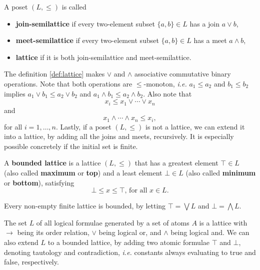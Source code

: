 \documentclass{llncs}
\begin{document}
\begin{definition}
\label{def:lattice}
A poset $(L, \leq)$ is called
\begin{itemize}
    \item \textbf{join-semilattice} if every two-element subset $\{a, b\} \in L$ has a join $a \vee b$,
    \item \textbf{meet-semilattice} if every two-element subset $\{a, b\} \in L$ has a meet $a \wedge b$,
    \item \textbf{lattice} if it is both join-semilattice and meet-semilattice.
\end{itemize}
\end{definition}

The definition \ref{def:lattice} makes $\vee$ and $\wedge$ associative commutative binary operations. Note that both operations are $\leq$-monoton, \textit{i.e.} $a_1 \leq a_2$ and $b_1 \leq b_2$ implies $a_1 \vee b_1 \leq a_2 \vee b_2$ and $a_1 \wedge b_1 \leq a_2 \wedge b_2$. Also note that
\begin{equation}
    x_i \leq x_1 \vee \cdots \vee x_n
\end{equation}
and
\begin{equation}
    x_1 \wedge \cdots \wedge x_n \leq x_i,
\end{equation}
for all $i = 1, \dots, n$. Lastly, if a poset $(L, \leq)$ is not a lattice, we can extend it into a lattice, by adding all the joins and meets, recursively. It is especially possible concretely if the initial set is finite.

\begin{definition}
A \textbf{bounded lattice} is a lattice $(L, \leq)$ that has a greatest element $\top \in L$ (also called \textbf{maximum} or \textbf{top}) and a least element $\bot \in L$ (also called \textbf{minimum} or \textbf{bottom}), satisfying
\begin{equation}
    \bot \leq x \leq \top \mbox{, for all } x \in L.
\end{equation}
\end{definition}

Every non-empty finite lattice is bounded, by letting $\top = \bigvee L$ and $\bot = \bigwedge L$.

\begin{example}
The set $L$ of all logical formulae generated by a set of atoms $A$ is a lattice with $\rightarrow$ being its order relation, $\vee$ being logical or, and $\wedge$ being logical and. We can also extend $L$ to a bounded lattice, by adding two atomic formulae $\top$ and $\bot$, denoting tautology and contradiction, \textit{i.e.} constants always evaluating to true and false, respectively.
\end{example}
\end{document}
